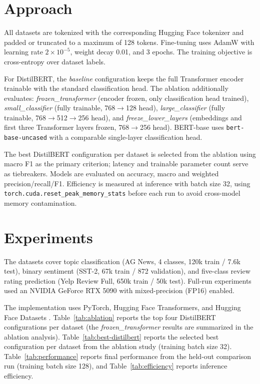 \documentclass{article}
\begin{document}
\section{Approach}
All datasets are tokenized with the corresponding Hugging Face tokenizer and padded or truncated to a maximum of 128 tokens. Fine-tuning uses AdamW with learning rate $2\times10^{-5}$, weight decay 0.01, and 3 epochs. The training objective is cross-entropy over dataset labels.

For DistilBERT, the \emph{baseline} configuration keeps the full Transformer encoder trainable with the standard classification head. The ablation additionally evaluates: \emph{frozen\_transformer} (encoder frozen, only classification head trained), \emph{small\_classifier} (fully trainable, 768$\to$128 head), \emph{large\_classifier} (fully trainable, 768$\to$512$\to$256 head), and \emph{freeze\_lower\_layers} (embeddings and first three Transformer layers frozen, 768$\to$256 head). BERT-base uses \texttt{bert-base-uncased} with a comparable single-layer classification head.

The best DistilBERT configuration per dataset is selected from the ablation using macro F1 as the primary criterion; latency and trainable parameter count serve as tiebreakers. Models are evaluated on accuracy, macro and weighted precision/recall/F1. Efficiency is measured at inference with batch size 32, using \texttt{torch.cuda.reset\_peak\_memory\_stats} before each run to avoid cross-model memory contamination.

\section{Experiments}
The datasets cover topic classification (AG News, 4 classes, 120k train / 7.6k test), binary sentiment (SST-2, 67k train / 872 validation), and five-class review rating prediction (Yelp Review Full, 650k train / 50k test). Full-run experiments used an NVIDIA GeForce RTX 5090 with mixed-precision (FP16) enabled.

The implementation uses PyTorch, Hugging Face Transformers, and Hugging Face Datasets \citep{paszke2019pytorch,wolf2020transformers,lhoest2021datasets}. Table~\ref{tab:ablation} reports the top four DistilBERT configurations per dataset (the \emph{frozen\_transformer} results are summarized in the ablation analysis). Table~\ref{tab:best-distilbert} reports the selected best configuration per dataset from the ablation study (training batch size 32). Table~\ref{tab:performance} reports final performance from the held-out comparison run (training batch size 128), and Table~\ref{tab:efficiency} reports inference efficiency.
\end{document}
